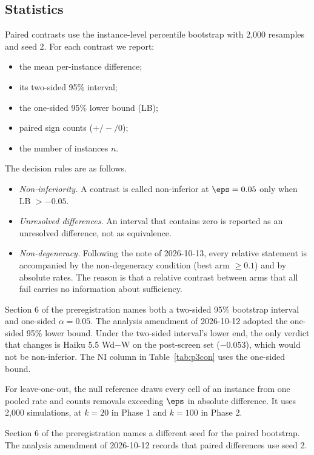 \subsection{Statistics}

Paired contrasts use the instance-level percentile bootstrap with 2,000 resamples and seed 2. For each contrast we report:
\begin{itemize}
\item the mean per-instance difference;
\item its two-sided 95\% interval;
\item the one-sided 95\% lower bound (LB);
\item paired sign counts ($+/-/0$);
\item the number of instances $n$.
\end{itemize}

The decision rules are as follows.
\begin{itemize}
\item \emph{Non-inferiority.} A contrast is called non-inferior at $\eps = 0.05$ only when LB $> -0.05$.
\item \emph{Unresolved differences.} An interval that contains zero is reported as an unresolved difference, not as equivalence.
\item \emph{Non-degeneracy.} Following the note of 2026-10-13, every relative statement is accompanied by the non-degeneracy condition (best arm $\geq 0.1$) and by absolute rates. The reason is that a relative contrast between arms that all fail carries no information about sufficiency.
\end{itemize}

Section 6 of the preregistration names both a two-sided 95\% bootstrap interval and one-sided $\alpha=0.05$. The analysis amendment of 2026-10-12 adopted the one-sided 95\% lower bound. Under the two-sided interval's lower end, the only verdict that changes is Haiku 5.5 Wd$-$W on the post-screen set ($-0.053$), which would not be non-inferior. The NI column in Table~\ref{tab:p3con} uses the one-sided bound.

For leave-one-out, the null reference draws every cell of an instance from one pooled rate and counts removals exceeding $\eps$ in absolute difference. It uses 2,000 simulations, at $k=20$ in Phase 1 and $k=100$ in Phase 2.

Section 6 of the preregistration names a different seed for the paired bootstrap. The analysis amendment of 2026-10-12 records that paired differences use seed 2.

